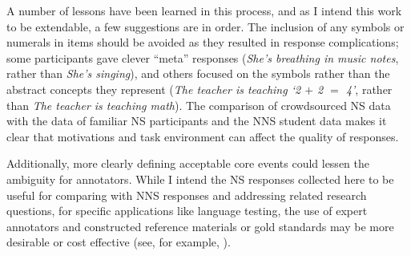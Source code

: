A number of lessons have been learned in this process, and as I intend this work to be extendable, a few suggestions are in order. The inclusion of any symbols or numerals in items should be avoided as they resulted in response complications; some participants gave clever ``meta'' responses (\textit{She's breathing in music notes}, rather than \textit{She's singing}), and others focused on the symbols rather than the abstract concepts they represent (\textit{The teacher is teaching `2 $+$ 2 $=$ 4'}, rather than \textit{The teacher is teaching math}). The comparison of crowdsourced NS data with the data of familiar NS participants and the NNS student data makes it clear that motivations and task environment can affect the quality of responses.

Additionally, more clearly defining acceptable core events could lessen the ambiguity for annotators. While I intend the NS responses collected here to be useful for comparing with NNS responses and addressing related research questions, for specific applications like language testing, the use of expert annotators and constructed reference materials or gold standards may be more desirable or cost effective (see, for example, \citet{somasundaran:chodorow:14}).
